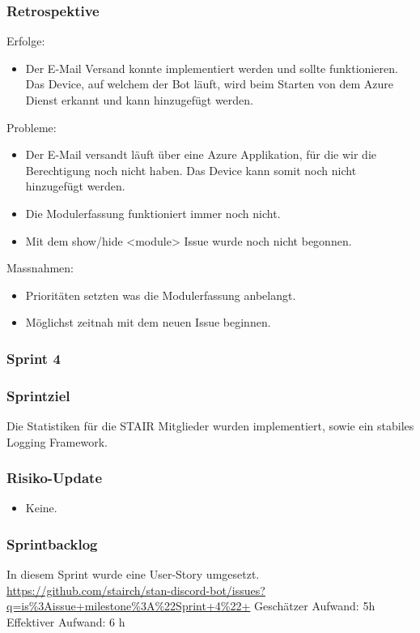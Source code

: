 \documentclass[a4paper, table]{article}
\begin{document}
\subsubsection*{Retrospektive}
Erfolge:
\begin{itemize}
    \item Der E-Mail Versand konnte implementiert werden und sollte funktionieren.
    Das Device, auf welchem der Bot läuft, wird beim Starten von dem Azure Dienst erkannt und kann hinzugefügt werden.
\end{itemize}
Probleme:
\begin{itemize}
    \item Der E-Mail versandt läuft über eine Azure Applikation, für die wir die Berechtigung noch nicht haben.
    Das Device kann somit noch nicht hinzugefügt werden.
    \item Die Modulerfassung funktioniert immer noch nicht.
    \item Mit dem show/hide <module> Issue wurde noch nicht begonnen.
\end{itemize}
Massnahmen:
\begin{itemize}
    \item Prioritäten setzten was die Modulerfassung anbelangt.
    \item Möglichst zeitnah mit dem neuen Issue beginnen.
\end{itemize}

\subsubsection{Sprint 4}
\subsubsection*{Sprintziel}
Die Statistiken für die STAIR Mitglieder wurden implementiert, sowie ein stabiles Logging Framework.

\subsubsection*{Risiko-Update}
\begin{itemize}
    \item Keine.
\end{itemize}

\subsubsection*{Sprintbacklog}
In diesem Sprint wurde eine User-Story umgesetzt.\\
\url{https://github.com/stairch/stan-discord-bot/issues?q=is%3Aissue+milestone%3A%22Sprint+4%22+}
\newline
Geschätzer Aufwand: 5h
\newline
Effektiver Aufwand: 6 h
\end{document}

